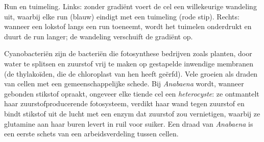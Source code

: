 \begin{omfigure}

{\small Run en tuimeling. Links: zonder gradiënt voert de cel een
willekeurige wandeling uit, waarbij elke run (blauw) eindigt met een
tuimeling (rode stip). Rechts: wanneer een lokstof langs een run
toeneemt, wordt het tuimelen onderdrukt en duurt de run langer; de
wandeling verschuift de gradiënt op.}
\end{omfigure}

\begin{example}\label{ex:b2:unicellular-diversity:cyanobacteria}
Cyanobacteriën zijn de bacteriën die fotosynthese bedrijven zoals
planten, door water te splitsen en zuurstof vrij te maken op gestapelde
inwendige membranen (de thylakoïden, die de chloroplast van hen heeft
geërfd). Vele groeien als draden van cellen met een gemeenschappelijke
schede. Bij \emph{Anabaena} wordt, wanneer gebonden stikstof opraakt,
ongeveer elke tiende cel een \emph{heterocyste}: ze ontmantelt haar
zuurstofproducerende fotosysteem, verdikt haar wand tegen zuurstof en
bindt stikstof uit de lucht met een enzym dat zuurstof zou vernietigen,
waarbij ze glutamine aan haar buren levert in ruil voor suiker. Een draad
van \emph{Anabaena} is een eerste schets van een arbeidsverdeling
tussen cellen.
\end{example}

